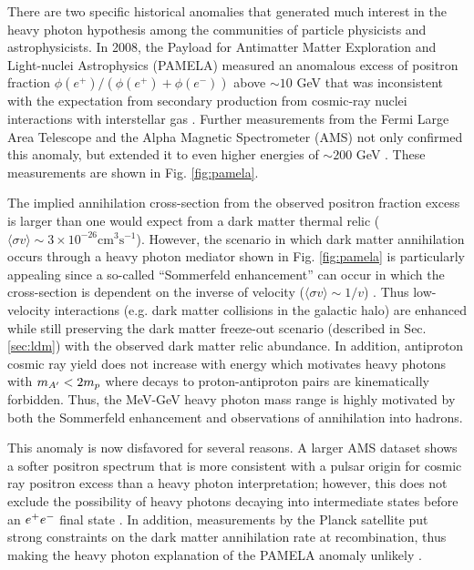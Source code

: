There are two specific historical anomalies that generated much interest in the heavy photon hypothesis among the communities of particle physicists and astrophysicists. In 2008, the Payload for Antimatter Matter Exploration and Light-nuclei Astrophysics (PAMELA) measured an anomalous excess of positron fraction $\phi (e^+)/(\phi (e^+) +\phi (e^-) )$ above $\sim 10$ GeV that was inconsistent with the expectation from secondary production from cosmic-ray nuclei interactions with interstellar gas \cite{Adriani:2008zr} \cite{ackermann2012}. Further measurements from the Fermi Large Area Telescope and the Alpha Magnetic Spectrometer (AMS) not only confirmed this anomaly, but extended it to even higher energies of $\sim 200$ GeV \cite{aguilar2013}. These measurements are shown in Fig. \ref{fig:pamela}. 

The implied annihilation cross-section from the observed positron fraction excess is larger than one would expect from a dark matter thermal relic ($\langle \sigma v \rangle \sim 3 \times 10^{-26}\mathrm{cm}^3 \mathrm{s}^{-1}$). However, the scenario in which dark matter annihilation occurs through a heavy photon mediator shown in Fig. \ref{fig:pamela} is particularly appealing since a so-called ``Sommerfeld enhancement'' can occur in which the cross-section is dependent on the inverse of velocity ($\langle \sigma v \rangle \sim 1/v$) \cite{ArkaniHamed:2008qn}. Thus low-velocity interactions (e.g. dark matter collisions in the galactic halo) are enhanced while still preserving the dark matter freeze-out scenario (described in Sec. \ref{sec:ldm}) with the observed dark matter relic abundance. In addition, antiproton cosmic ray yield does not increase with energy which motivates heavy photons with $m_{A^\prime} < 2m_p$ where decays to proton-antiproton pairs are kinematically forbidden. Thus, the MeV-GeV heavy photon mass range is highly motivated by both the Sommerfeld enhancement and observations of annihilation into hadrons.

This anomaly is now disfavored for several reasons. A larger AMS dataset shows a softer positron spectrum that is more consistent with a pulsar origin for cosmic ray positron excess than a heavy photon interpretation; however, this does not exclude the possibility of heavy photons decaying into intermediate states before an $e^{+}e^{-}$ final state \cite{Cholis:2013psa}. In addition, measurements by the Planck satellite put strong constraints on the dark matter annihilation rate at recombination, thus making the heavy photon explanation of the PAMELA anomaly unlikely \cite{Ade:2015xua}.


